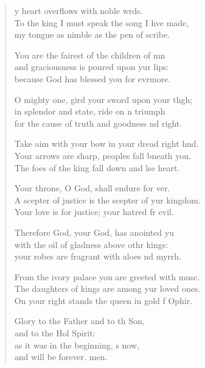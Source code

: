 \begin{verse}
  \begin{patverse}
y heart overflows with noble wrds.\Flex\\
To the king I must speak the song I hve made,\Med\\
my tongue as nimble as the pen of  scribe.

You are the fairest of the children of mn\Flex\\
and graciousness is poured upon yur lips:\Med\\
because God has blessed you for evrmore.

O mighty one, gird your sword upon your th\pointup{\i}gh;\Flex\\
in splendor and state, ride on \pointup{\i}n triumph\Med\\
for the cause of truth and goodness nd right.

Take aim with your bow in your dread right hnd.\Flex\\
Your arrows are sharp, peoples fall bneath you.\Med\\
The foes of the king fall down and lse heart.

Your throne, O God, shall endure for ver.\Flex\\
A scepter of justice is the scepter of yur kingdom.\Med\\
Your love is for justice; your hatred fr evil.

Therefore God, your God, has anointed yu\Flex\\
with the oil of gladness above othr kings:\Med\\
your robes are fragrant with aloes nd myrrh.

From the ivory palace you are greeted with mus\pointup{\i}c.\Flex\\
The daughters of kings are among yur loved ones.\Med\\
On your right stands the queen in gold f Ophir.

Glory to the Father and to th Son,\Med\\
and to the Hol Spirit:\\
as it was in the beginning, \pointup{\i}s now,\Med\\
and will be forever. men. 
  \end{patverse}
\end{verse}
